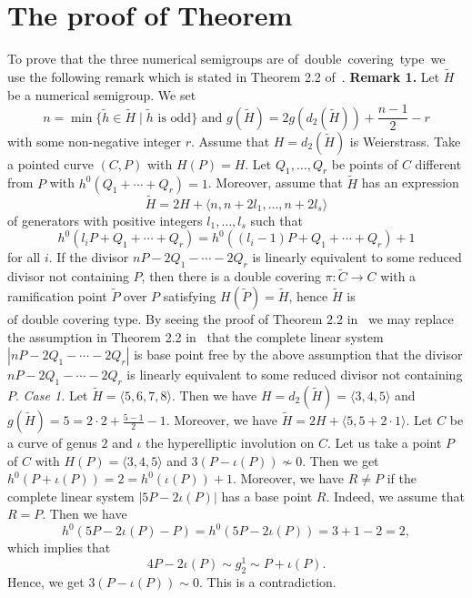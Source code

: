 \documentclass[a4paper,12pt]{article}
\newcommand{\tH}{\tilde{H}}
\newcommand{\tC}{\tilde{C}}
\newcommand{\tP}{\tilde{P}}
\newcommand{\tih}{\tilde{h}}
\newcommand{\la}{\langle}
\newcommand{\ra}{\rangle}
\newcommand{\dis}{\displaystyle}
\newcommand{\DC}{\mbox{of double covering type}}
\begin{document}
\section{The proof of Theorem}
%
To prove that the three numerical semigroups are \DC  \ we use the following remark which is stated in Theorem 2.2 of~\cite{kom3}.
\vskip3mm
\noindent
{\bf Remark 1. }Let $\tH$ be a numerical semigroup.
We set
$$n=\min\{\tih\in \tH\mid \tih\mbox{ is odd}\}\mbox{ and }g(\tH)=2g(d_2(\tH))+\frac{n-1}{2}-r$$
with some non-negative integer $r$.
Assume that $H=d_2(\tH)$ is Weierstrass.
Take a pointed curve $(C,P)$ with $H(P)=H$.
Let $Q_1,\ldots,Q_r$ be points of $C$ different from $P$ with $h^0(Q_1+\cdots+Q_r)=1$.
Moreover, assume that $\tH$ has an expression
$$\tH=2H+\la n,n+2l_1,\ldots,n+2l_s\ra$$
of generators with positive integers $l_1,\ldots,l_s$ such that
$$h^0(l_iP+Q_1+\cdots+Q_r)=h^0((l_i-1)P+Q_1+\cdots+Q_r)+1$$
for all $i$.
If the divisor $nP-2Q_1-\cdots-2Q_r$ is linearly equivalent to some reduced divisor not containing $P$, then there is a double covering $\pi:\tC\longrightarrow C$ with a ramification point $\tP$ over $P$ satisfying $H(\tP)=\tH$, hence $\tH$ is $\DC$.
\vskip3mm
\noindent
By seeing the proof of Theorem 2.2 in~\cite{kom3} we may replace the assumption in Theorem 2.2 in~\cite{kom3} that the complete linear system $|nP-2Q_1-\cdots-2Q_r|$ is base point free by the above assumption that the divisor $nP-2Q_1-\cdots-2Q_r$ is linearly equivalent to some reduced divisor not containing $P$.
\vskip3mm
\noindent
{\it Case 1.} Let $\tH=\la 5,6,7,8\ra$.
Then we have $H=d_2(\tH)=\la 3,4,5\ra$ and $\dis g(\tH)=5=2\cdot 2+\frac{5-1}{2}-1$.
Moreover, we have $\tH=2H+\la 5,5+2\cdot 1\ra$.
Let $C$ be a curve of genus $2$ and $\iota$ the hyperelliptic involution on $C$.
Let us take a point $P$ of $C$ with $H(P)=\la 3,4,5\ra$ and $3(P-\iota(P))\not\sim 0$.
Then we get $h^0(P+\iota(P))=2=h^0(\iota(P))+1$.
Moreover, we have $R\not=P$ if the complete linear system $|5P-2\iota(P)|$ has a base point $R$.
Indeed, we assume that $R=P$.
Then we have
$$h^0(5P-2\iota(P)-P)=h^0(5P-2\iota(P))=3+1-2=2,$$
which implies that
$$4P-2\iota(P)\sim g_2^1\sim P+\iota(P).$$
Hence, we get $3(P-\iota(P))\sim 0$.
This is a contradiction.
\end{document}
